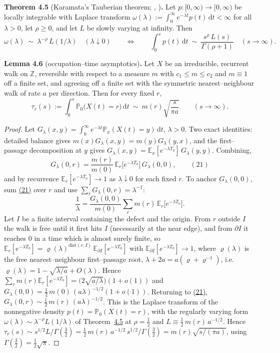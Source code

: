 \documentclass[11pt]{article}
\theoremstyle{plain}
\theoremstyle{definition}
\theoremstyle{remark}
\newcommand{\Z}{\mathbb{Z}}\newcommand{\R}{\mathbb{R}}\newcommand{\N}{\mathbb{N}}
\newcommand{\E}{\mathbb{E}}\newcommand{\PP}{\mathbb{P}}\newcommand{\dd}{\,\mathrm{d}}
\begin{document}
\label{thm_karamata}\noindent\textbf{Theorem 4.5} (Karamata's Tauberian theorem; {\cite[Thm.~1.7.1$'$]{BGT}}, {\cite[\S XIII.5]{Feller2}})\textbf{.} 
Let $p:[0,\infty)\to[0,\infty)$ be locally integrable with Laplace transform
$\omega(\lambda):=\int_0^\infty e^{-\lambda t}p(t)\dd t<\infty$ for all $\lambda>0$, let
$\rho\ge0$, and let $L$ be slowly varying at infinity. Then
\[
  \omega(\lambda)\ \sim\ \lambda^{-\rho}\,L(1/\lambda)\quad(\lambda\downarrow0)
  \qquad\Longleftrightarrow\qquad
  \int_0^s p(t)\dd t\ \sim\ \frac{s^{\rho}\,L(s)}{\Gamma(\rho+1)}\quad(s\to\infty).
\]
\par

\label{lem_tau}\noindent\textbf{Lemma 4.6} (occupation--time asymptotics)\textbf{.} 
Let $X$ be an irreducible, recurrent walk on $\Z$, reversible with respect to a
measure $m$ with $c_1\le m\le c_2$ and $m\equiv1$ off a finite set, and agreeing off a
finite set with the symmetric nearest--neighbour walk of rate $a$ per direction. Then
for every fixed $r$,
\[
  \tau_r(s):=\int_0^s\PP_0\big(X(t)=r\big)\dd t\ \sim\ m(r)\sqrt{\frac{s}{\pi a}}
  \qquad(s\to\infty).
\]
\par
\begin{proof}
Let $G_\lambda(x,y)=\int_0^\infty e^{-\lambda t}\PP_x(X(t)=y)\dd t$, $\lambda>0$. Two
exact identities: detailed balance gives $m(x)G_\lambda(x,y)=m(y)G_\lambda(y,x)$, and
the first--passage decomposition at $y$ gives
$G_\lambda(x,y)=\E_x[e^{-\lambda T_y}]\,G_\lambda(y,y)$. Combining,
\label{eq_Gid}
\begin{equation}
  G_\lambda(0,r)=\frac{m(r)}{m(0)}\,\E_r\big[e^{-\lambda T_0}\big]\,G_\lambda(0,0),\qquad(21)
\end{equation}
and by recurrence $\E_r[e^{-\lambda T_0}]\to1$ as $\lambda\downarrow0$ for each fixed
$r$. To anchor $G_\lambda(0,0)$, sum \hyperref[eq_Gid]{(21)} over $r$ and use
$\sum_rG_\lambda(0,r)=\lambda^{-1}$:
\[
  \frac1\lambda=\frac{G_\lambda(0,0)}{m(0)}\sum_r m(r)\,\E_r\big[e^{-\lambda T_0}\big].
\]
Let $I$ be a finite interval containing the defect and the origin. From $r$ outside
$I$ the walk is free until it first hits $I$ (necessarily at the near edge), and from
$\partial I$ it reaches $0$ in a time which is almost surely finite, so
$\E_r[e^{-\lambda T_0}]=\varrho(\lambda)^{\mathrm{dist}(r,I)}\,
\E_{\partial I}[e^{-\lambda T_0}]$ with $\E_{\partial I}[e^{-\lambda T_0}]\to1$, where
$\varrho(\lambda)$ is the free nearest--neighbour first--passage root,
$\lambda+2a=a(\varrho+\varrho^{-1})$, i.e.\
$\varrho(\lambda)=1-\sqrt{\lambda/a}+O(\lambda)$. Hence
$\sum_rm(r)\E_r[e^{-\lambda T_0}]=\big(2\sqrt{a/\lambda}\big)(1+o(1))$ and
$G_\lambda(0,0)=\tfrac12\,m(0)\,(a\lambda)^{-1/2}(1+o(1))$. Returning to
\hyperref[eq_Gid]{(21)}, $G_\lambda(0,r)\sim\tfrac12\,m(r)\,(a\lambda)^{-1/2}$. This is the
Laplace transform of the nonnegative density $p(t)=\PP_0(X(t)=r)$, with the regularly
varying form $\omega(\lambda)\sim\lambda^{-\rho}L(1/\lambda)$ of
Theorem~\hyperref[thm_karamata]{4.5} at $\rho=\tfrac12$ and $L\equiv\tfrac12\,m(r)\,a^{-1/2}$.
Hence $\tau_r(s)\sim s^{1/2}L/\Gamma(\tfrac32)=\tfrac12\,m(r)\,a^{-1/2}\,s^{1/2}/\Gamma(\tfrac32)
=m(r)\sqrt{s/(\pi a)}$, using $\Gamma(\tfrac32)=\tfrac12\sqrt\pi$.
\end{proof}
\end{document}
